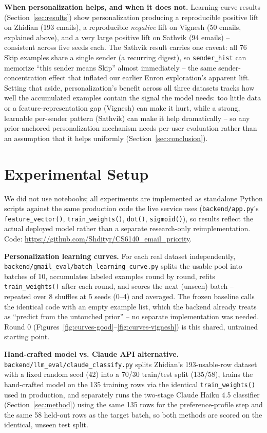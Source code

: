 \documentclass[twoside,twocolumn,10pt]{article}
\begin{document}
\textbf{When personalization helps, and when it does not.} Learning-curve results (Section~\ref{sec:results}) show personalization producing a reproducible positive lift on Zhidian (193 emails), a reproducible \emph{negative} lift on Vignesh (50 emails, explained above), and a very large positive lift on Sathvik (94 emails) -- consistent across five seeds each. The Sathvik result carries one caveat: all 76 Skip examples share a single sender (a recurring digest), so \texttt{sender\_hist} can memorize ``this sender means Skip'' almost immediately -- the same sender-concentration effect that inflated our earlier Enron exploration's apparent lift. Setting that aside, personalization's benefit across all three datasets tracks how well the accumulated examples contain the signal the model needs: too little data or a feature-representation gap (Vignesh) can make it hurt, while a strong, learnable per-sender pattern (Sathvik) can make it help dramatically -- so any prior-anchored personalization mechanism needs per-user evaluation rather than an assumption that it helps uniformly (Section~\ref{sec:conclusion}).

\section{Experimental Setup}
\label{sec:setup}

We did not use notebooks; all experiments are implemented as standalone Python scripts against the same production code the live service uses (\texttt{backend/app.py}'s \texttt{feature\_vector()}, \texttt{train\_weights()}, \texttt{dot()}, \texttt{sigmoid()}), so results reflect the actual deployed model rather than a separate research-only reimplementation. Code: \url{https://github.com/Shdityr/CS6140_email_priority}.

\textbf{Personalization learning curves.} For each real dataset independently, \texttt{backend/gmail\_eval/batch\_learning\_curve.py} splits the usable pool into batches of 10, accumulates labeled examples round by round, refits \texttt{train\_weights()} after each round, and scores the next (unseen) batch -- repeated over 8 shuffles at 5 seeds (0--4) and averaged. The frozen baseline calls the identical code with an empty example list, which the backend already treats as ``predict from the untouched prior'' -- no separate implementation was needed. Round 0 (Figures~\ref{fig:curves-good}--\ref{fig:curves-vignesh}) is this shared, untrained starting point.

\textbf{Hand-crafted model vs. Claude API alternative.} \texttt{backend/llm\_eval/claude\_classify.py} splits Zhidian's 193-usable-row dataset with a fixed random seed (42) into a 70/30 train/test split (135/58), trains the hand-crafted model on the 135 training rows via the identical \texttt{train\_weights()} used in production, and separately runs the two-stage Claude Haiku 4.5 classifier (Section~\ref{sec:method}) using the same 135 rows for the preference-profile step and the same 58 held-out rows as the target batch, so both methods are scored on the identical, unseen test split.
\end{document}
